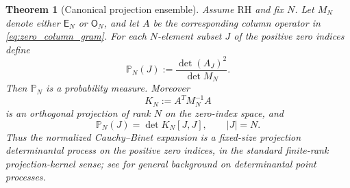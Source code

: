 \documentclass[preprint,12pt]{elsarticle}
\numberwithin{equation}{section}
\theoremstyle{plain}
\newtheorem{theorem}{Theorem}[section]
\theoremstyle{definition}
\theoremstyle{remark}
\newcommand{\RH}{\mathrm{RH}}
\newcommand{\E}{\mathsf E}
\newcommand{\Omat}{\mathsf O}
\begin{document}
\begin{theorem}[Canonical projection ensemble]
\label{thm:canonical_projection_ensemble}
Assume $\RH$ and fix $N$.  Let $M_N$ denote either $\E_N$ or $\Omat_N$, and let $A$ be the corresponding column operator in \eqref{eq:zero_column_gram}.  For each $N$-element subset $J$ of the positive zero indices define
\begin{equation}
\mathbb P_N(J):=
\frac{\det(A_J)^2}{\det M_N}.
\label{eq:CB_probability}
\end{equation}
Then $\mathbb P_N$ is a probability measure.  Moreover
\begin{equation}
K_N:=A^TM_N^{-1}A
\label{eq:projection_kernel_zero_indices}
\end{equation}
is an orthogonal projection of rank $N$ on the zero-index space, and
\begin{equation}
\mathbb P_N(J)=\det K_N[J,J],
\qquad |J|=N.
\label{eq:projection_DPP_formula}
\end{equation}
Thus the normalized Cauchy--Binet expansion is a fixed-size projection determinantal process
on the positive zero indices, in the standard finite-rank projection-kernel sense; see
\cite{HoughKrishnapurPeresVirag2009} for general background on determinantal point processes.
\end{theorem}
\end{document}
